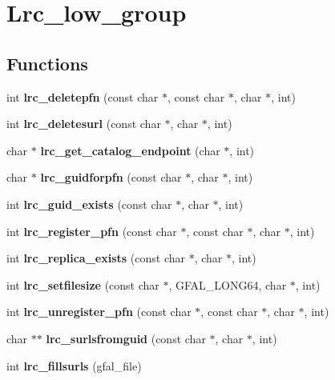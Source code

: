 \section{Lrc\_\-low\_\-group}
\label{group__lrc__low__group}
\subsection*{Functions}
\begin{CompactItemize}
\item 
int \textbf{lrc\_\-deletepfn} (const char $\ast$, const char $\ast$, char $\ast$, int)\label{group__lrc__low__group_gfb95edd6b28647a833628fd3fc2ca359}

\item 
int \textbf{lrc\_\-deletesurl} (const char $\ast$, char $\ast$, int)\label{group__lrc__low__group_g4ff0ff98335d60bfac387172a465462e}

\item 
char $\ast$ \textbf{lrc\_\-get\_\-catalog\_\-endpoint} (char $\ast$, int)\label{group__lrc__low__group_g865334a6161cab9f34962f728ccea66c}

\item 
char $\ast$ \textbf{lrc\_\-guidforpfn} (const char $\ast$, char $\ast$, int)\label{group__lrc__low__group_g42cffe6a850a6cc3a5c8d47ec1f4d346}

\item 
int \textbf{lrc\_\-guid\_\-exists} (const char $\ast$, char $\ast$, int)\label{group__lrc__low__group_gcfc94b50fd3f9d468567a921b0360ed3}

\item 
int \textbf{lrc\_\-register\_\-pfn} (const char $\ast$, const char $\ast$, char $\ast$, int)\label{group__lrc__low__group_gc44d46e03e25c9dd591fbf6c27c2271a}

\item 
int \textbf{lrc\_\-replica\_\-exists} (const char $\ast$, char $\ast$, int)\label{group__lrc__low__group_ge108dd786bc1f35a2b0dd9c4a4382100}

\item 
int \textbf{lrc\_\-setfilesize} (const char $\ast$, GFAL\_\-LONG64, char $\ast$, int)\label{group__lrc__low__group_gb029cd5012531ce0dc866795414661ed}

\item 
int \textbf{lrc\_\-unregister\_\-pfn} (const char $\ast$, const char $\ast$, char $\ast$, int)\label{group__lrc__low__group_gae0d39dcf2616c13abbc4c8de9cbeb23}

\item 
char $\ast$$\ast$ \textbf{lrc\_\-surlsfromguid} (const char $\ast$, char $\ast$, int)\label{group__lrc__low__group_g797ad706a9a73e2329b408f5745911a5}

\item 
int \textbf{lrc\_\-fillsurls} (gfal\_\-file)\label{group__lrc__low__group_g705a069b21fb23d2b53742c51df8bb40}

\end{CompactItemize}
